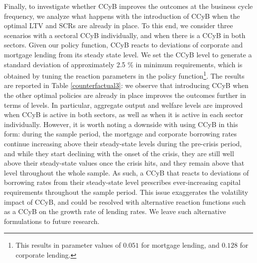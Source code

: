 \documentclass[12pt]{article}
\numberwithin{equation}{section}
\begin{document}




Finally, to investigate whether CCyB improves the outcomes at the business cycle frequency, we analyze what happens with the introduction of CCyB when the optimal LTV and SCRs are already in place. To this end, we consider three scenarios with a sectoral CCyB individually, and when there is a CCyB in both sectors. Given our policy function, CCyB reacts to deviations of corporate and mortgage lending from its steady state level. We set the CCyB level to generate a standard deviation of approximately 2.5 \% in minimum requirements, which is obtained by tuning the reaction parameters in the policy function\footnote{This results in parameter values of $0.051$ for mortgage lending, and $0.128$ for corporate lending.}. The results are reported in Table \ref{counterfactual3}: we observe that introducing CCyB when the other optimal policies are already in place improves the outcomes further in terms of levels. In particular, aggregate output and welfare levels are improved when CCyB is active in both sectors, as well as when it is active in each sector individually. However, it is worth noting a downside with using CCyB in this form: during the sample period, the mortgage and corporate borrowing rates continue increasing above their steady-state levels during the pre-crisis period, and while they start declining with the onset of the crisis, they are still well above their steady-state values once the crisis hits, and they remain above that level throughout the whole sample. As such, a CCyB that reacts  to deviations of borrowing rates from their steady-state level prescribes ever-increasing capital requirements throughout the sample period. This issue exaggerates the volatility impact of CCyB, and could be resolved with alternative reaction functions such as a CCyB on the growth rate of lending rates. We leave such alternative formulations to future research. 
\end{document}

